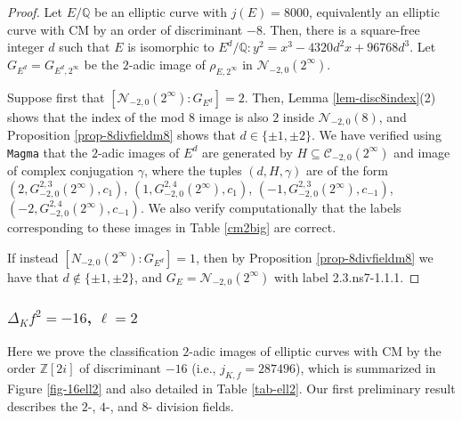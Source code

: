 \documentclass[11pt]{amsart}
\theoremstyle{definition}
\newcommand{\Q}{\mathbb Q}
\newcommand{\Z}{\mathbb Z}
\begin{document}
\begin{proof}
    Let $E/\Q$ be an elliptic curve with $j(E) = 8000$, equivalently an elliptic curve with CM by an order of discriminant $-8$. Then, there is a square-free integer $d$ such that $E$ is isomorphic to $E^d/\Q : y^2=x^3 - 4320d^2 x + 96768d^3$. Let $G_{E^d} = G_{E^d,2^\infty}$ be the $2$-adic image of $\rho_{E, 2^{\infty}}$ in $\mathcal{N}_{-2,0}(2^{\infty})$.

    Suppose first that $[\mathcal{N}_{-2,0}(2^{\infty}) : G_{E^d} ] = 2$. Then, Lemma \ref{lem-disc8index}(2) shows that the index of the mod 8 image is also $2$ inside $\mathcal{N}_{-2,0}(8)$, and Proposition \ref{prop-8divfieldm8} shows that $d \in \{ \pm 1, \pm 2 \}$. We have verified using \verb|Magma| that the $2$-adic images of $E^d$ are generated by $H \subseteq \mathcal{C}_{-2, 0}(2^{\infty})$ and image of complex conjugation $\gamma$, where the tuples $(d, H, \gamma)$ are of the form $(2, G^{2,3}_{-2,0}(2^{\infty}), c_1)$, $(1, G^{2,4}_{-2,0}(2^{\infty}), c_1)$, $(-1, G^{2,3}_{-2,0}(2^{\infty}), c_{-1})$, $(-2, G^{2,4}_{-2,0}(2^{\infty}), c_{-1})$. We also verify computationally that the labels corresponding to these images in Table \ref{cm2big} are correct.

    If instead $[N_{-2, 0}(2^{\infty}) : G_{E^d}] = 1$, then by Proposition \ref{prop-8divfieldm8} we have that $d \notin \{ \pm 1, \pm 2 \}$, and $G_E = \mathcal{N}_{-2, 0}(2^{\infty})$ with label 2.3.ns7-1.1.1. 
\end{proof}



\subsubsection{$\Delta_Kf^2=-16$, $\ell = 2$}\label{sec-16ell2} Here we prove the classification $2$-adic images of elliptic curves with CM by the order $\Z[2i]$ of discriminant $-16$ (i.e., $j_{K,f}=287496$), which is summarized in Figure \ref{fig-16ell2} and also detailed in Table \ref{tab-ell2}. Our first preliminary result describes the $2$-, $4$-, and $8$- division fields.
\end{document}
